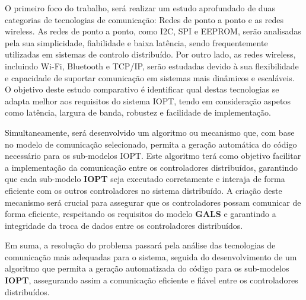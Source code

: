 O primeiro foco do trabalho, será realizar um estudo aprofundado de duas categorias de tecnologias de comunicação: Redes de ponto a ponto e as redes wireless. As redes de ponto a ponto, como I2C, SPI e EEPROM, serão analisadas pela sua simplicidade, fiabilidade e baixa latência, sendo frequentemente utilizadas em sistemas de controlo distribuído. Por outro lado, as redes wireless, incluindo Wi-Fi, Bluetooth e TCP/IP, serão estudadas devido à sua flexibilidade e capacidade de suportar comunicação em sistemas mais dinâmicos e escaláveis. O objetivo deste estudo comparativo é identificar qual destas tecnologias se adapta melhor aos requisitos do sistema IOPT, tendo em consideração aspetos como latência, largura de banda, robustez e facilidade de implementação.

Simultaneamente, será desenvolvido um algoritmo ou mecanismo que, com base no modelo de comunicação selecionado, permita a geração automática do código necessário para os sub-modelos IOPT. Este algoritmo terá como objetivo facilitar a implementação da comunicação entre os controladores distribuídos, garantindo que cada sub-modelo \textbf{IOPT} seja executado corretamente e interaja de forma eficiente com os outros controladores no sistema distribuído. A criação deste mecanismo será crucial para assegurar que os controladores possam comunicar de forma eficiente, respeitando os requisitos do modelo \textbf{GALS} e garantindo a integridade da troca de dados entre os controladores distribuídos.

Em suma, a resolução do problema passará pela análise das tecnologias de comunicação mais adequadas para o sistema, seguida do desenvolvimento de um algoritmo que permita a geração automatizada do código para os sub-modelos \textbf{IOPT}, assegurando assim a comunicação eficiente e fiável entre os controladores distribuídos.




